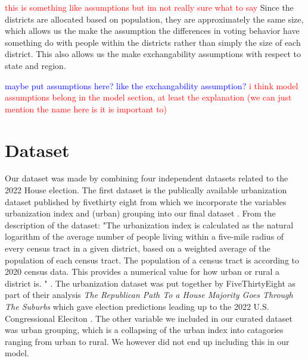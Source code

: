 \documentclass[12pt]{article}
\newcommand{\red}[1]{\textcolor{red}{#1}}
\newcommand{\blue}[1]{\textcolor{blue}{#1}}
\begin{document}




\textcolor{red}{this is something like assumptions but im not really sure what to say}
Since the districts are allocated based on population, they are approximately the same size, which allows us the make the assumption the differences in voting behavior have something do with people within the districts rather than simply the size of each district. This also allows us the make exchangability assumptions with respect to state and region.

\blue{maybe put assumptions here? like the exchangability assumption?}
\red{i think model assumptions belong in the model section, at least the explanation (we can just mention the name here is it is important to)}


\section{Dataset}
Our dataset was made by combining four independent datasets related to the 2022 House election. The first dataset is the publically available urbanization dataset published by fivethirty eight from which we incorporate the variables urbanization index  and (urban) grouping into our final dataset \cite{urbanizationdataset}. From the description of the dataset: "The urbanization index is calculated as the natural logarithm of the average number of people living within a five-mile radius of every census tract in a given district, based on a weighted average of the population of each census tract. The population of a census tract is according to 2020 census data. This provides a numerical value for how urban or rural a district is. " \cite{urbanizationdataset}. The urbanization dataset was put together by FiveThirtyEight as part of their analysis  \textit{The Republican Path To a House Majority Goes Through The Suburbs} which gave election predictions leading up to the 2022 U.S. Congressional Eleciton \cite{538urbanizationarticle}. The other variable we included in our curated dataset was urban grouping, which is a collapsing of the urban index into catagories ranging from urban to rural. We however did not end up including this in our model.
\end{document}

